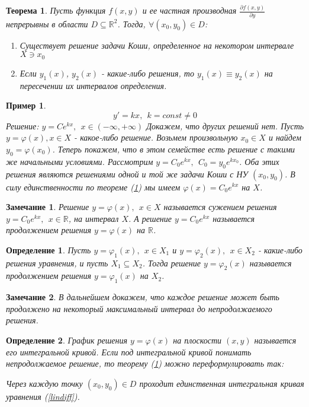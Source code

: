 \documentclass{article}
\newtheorem*{df}{Определение}
\newtheorem{teo}{Теорема}
\newtheorem*{ntc}{Замечание}
\newtheorem{xmp}{Пример}
\begin{document}
  \begin{teo}
  \label{koshi}
  Пусть функция $f(x, y)$ и ее частная производная $\frac{\partial f(x,y)}{\partial y}$ непрерывны в области $D\subseteq \mathbb{R}^2$. Тогда, $\forall (x_0, y_0) \in D$:
  \begin{enumerate}
  \item Существует решение задачи Коши, определенное на некотором интервале $ X \ni x_0 $
  \item Если $y_1(x)$, $y_2(x)$ - какие-либо решения, то $y_1(x) \equiv y_2(x)$ на пересечении их интервалов определения.
  \end{enumerate}
  \end{teo}
  
  \begin{xmp}
  $$ y' = kx ,~~ k = const \neq 0 $$
  Решение: $y = Ce^{kx}, ~~ x \in (-\infty, +\infty)$
  Докажем, что других решений нет. Пусть $y = \varphi(x), x \in X$ - какое-либо решение. Возьмем произвольную $x_0 \in X$ и найдем $y_0 = \varphi(x_0)$. Теперь покажем, что в этом семействе есть решение с такими же начальными условиями. Рассмотрим $ y = C_0 e^{kx},~~ C_0 = y_0e^{kx_0} $.  Оба этих решения являются решениями одной и той же задачи Коши с НУ $(x_0, y_0)$. В силу единственности по теореме (\ref{koshi}) мы имеем $\varphi(x)  = C_0 e^{kx}$ на $X$.
  \end{xmp}
  \begin{ntc}
  Решение $y = \varphi (x),~~ x \in X$ называется сужением решения $y = C_0e^{kx},~~ x \in \mathbb{R}$, на интервал $X$. А решение $y = C_0e^{kx}$ называется продолжением решения $y = \varphi (x)$ на $\mathbb{R} $.
  \end{ntc}
  
  \begin{df}
  Пусть $ y = \varphi_1(x),~~ x \in X_1 $ и $ y = \varphi_2(x),~~ x \in X_2 $ - какие-либо решения уравнения, и пусть $ X_1 \subseteq X_2 $. Тогда решение $ y = \varphi_2(x) $ называется продолжением решения $ y = \varphi_1(x) $ на $X_2$.
  \end{df} 
  \begin{ntc}
  В дальнейшем докажем, что каждое решение может быть продолжено на некоторый максимальный интервал до непродолжаемого решения.
  \end{ntc}
  
  \begin{df}
  График решения $ y = \varphi(x) $ на плоскости $(x, y)$  называется его интегральной кривой. Если под интегральной кривой понимать непродолжаемое решение, то теорему (\ref{koshi}) можно переформулировать так:
  
  Через каждую точку $(x_0, y_0) \in D$ проходит единственная интегральная кривая уравнения (\ref{lindiff}). 
  \end{df}
  
\end{document}
